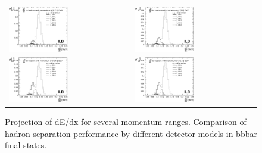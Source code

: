 \documentclass[preprint]{elsarticle}
\begin{document}
\begin{itemize}
\begin{figure}[h!]
\centering
\begin{tabular}{ll}
  \includegraphics[width=0.5\textwidth]{figures_Methods/separation_had_2GeV_models_v2.eps} & 
  \includegraphics[width=0.5\textwidth]{figures_Methods/separation_had_5GeV_models_v2.eps} \\ 
  \includegraphics[width=0.5\textwidth]{figures_Methods/separation_had_10GeV_models_v2.eps} & 
  \includegraphics[width=0.5\textwidth]{figures_Methods/separation_had_10GeV_models_v2.eps} 	
\end{tabular}
\caption{Projection of dE/dx for several momentum ranges. Comparison of hadron separation performance by different detector models in bbbar final states.}
\label{fig_dEdx_1}
\end{figure}


\end{itemize}
\end{document}
